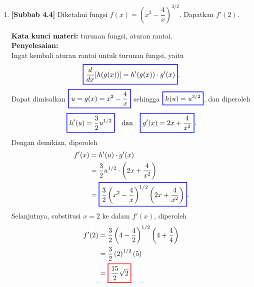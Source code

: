 \documentclass[10pt,openany,a4paper]{article}
\theoremstyle{definition}
\theoremstyle{definition}
\theoremstyle{plain}
\newenvironment{jawab}[2][tes]{%
\par\noindent\textbf{Kata kunci materi:} #1.\\
\textbf{Penyelesaian:} #2%
}{}
\begin{document}
\begin{enumerate}
    \item \textbf{[Subbab 4.4]} Diketahui fungsi $f(x)=\left(x^2-\dfrac{4}{x}\right)^{3/2}$. Dapatkan $f'(2)$.
    \begin{jawab}[turunan fungsi, aturan rantai]{~\\
        Ingat kembali aturan rantai untuk turunan fungsi, yaitu
        \[
        \colorlet{oldcolor}{.}
        \color{blue}
        \setlength{\fboxrule}{1pt} \boxed{\color{oldcolor}\frac{d}{dx}[h(g(x))] = h'(g(x)) \cdot g'(x)}\color{oldcolor}.
        \]
        Dapat dimisalkan $\colorlet{oldcolor}{.}
        \color{blue}
        \setlength{\fboxrule}{1pt} \boxed{\color{oldcolor}u=g(x) = x^2-\frac{4}{x}}\color{oldcolor}$ sehingga $\colorlet{oldcolor}{.}
        \color{blue}
        \setlength{\fboxrule}{1pt} \boxed{\color{oldcolor}h(u) = u^{3/2}}\color{oldcolor}$, dan diperoleh
        \begin{align*}
            \colorlet{oldcolor}{.}
        \color{blue}
        \setlength{\fboxrule}{1pt} \boxed{\color{oldcolor}h'(u) = \frac{3}{2}u^{1/2}}\color{oldcolor} \quad \text{dan}\quad
        \colorlet{oldcolor}{.}
        \color{blue}
        \setlength{\fboxrule}{1pt} \boxed{\color{oldcolor}g'(x) = 2x+\frac{4}{x^2}}\color{oldcolor}.
        \end{align*}
        Dengan demikian, diperoleh
        \begin{align*}
            f'(x) &=
            h'(u) \cdot g'(x)\\
            &= \frac{3}{2}u^{1/2} \cdot \left(2x+\frac{4}{x^2}\right)\\
            &= \colorlet{oldcolor}{.}
        \color{blue}
        \setlength{\fboxrule}{1pt} \boxed{\color{oldcolor}\frac{3}{2}\left(x^2-\frac{4}{x}\right)^{1/2} \left(2x+\frac{4}{x^2}\right)}\color{oldcolor}.
        \end{align*}
        Selanjutnya, substitusi $x=2$ ke dalam $f'(x)$, diperoleh
        \begin{align*}
            f'(2) &= \frac{3}{2}\left(4-\frac{4}{2}\right)^{1/2} \left(4+\frac{4}{4}\right)\\
            &= \frac{3}{2}\left(2\right)^{1/2} \left(5\right)\\
            &= \colorlet{oldcolor}{.}
        \color{red}
        \setlength{\fboxrule}{1pt} \boxed{\color{oldcolor}\frac{15}{2}\sqrt{2}}\color{oldcolor}.
        \end{align*}
    }
    \end{jawab}
\end{enumerate}
\end{document}
